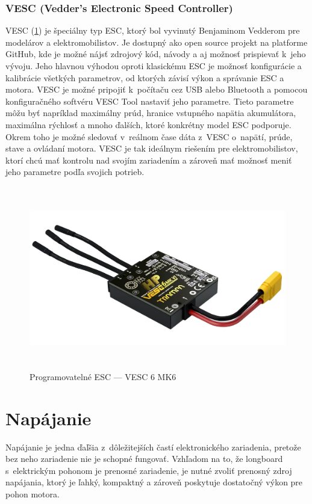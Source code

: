 \subsubsection{VESC (Vedder's Electronic Speed Controller)}
VESC (\ref{fig:vesc}) je špeciálny typ ESC, ktorý bol vyvinutý Benjaminom Vedderom pre modelárov a elektromobilistov.
Je dostupný ako open source projekt na platforme GitHub, kde je možné nájsť zdrojový kód, návody a aj možnosť prispievať k~jeho vývoju.
Jeho hlavnou výhodou oproti klasickému ESC je možnosť konfigurácie a kalibrácie všetkých parametrov, od ktorých závisí výkon a správanie ESC a motora.
VESC je možné pripojiť k~počítaču cez USB alebo Bluetooth a pomocou konfiguračného softvéru VESC Tool nastaviť jeho parametre.
Tieto parametre môžu byť napríklad maximálny prúd, hranice vstupného napätia akumulátora, maximálna rýchlosť a mnoho ďalších, ktoré konkrétny model ESC podporuje.
Okrem toho je možné sledovať v~reálnom čase dáta z~VESC o~napätí, prúde, stave a ovládaní motora.
VESC je tak ideálnym riešením pre elektromobilistov, ktorí chcú mať kontrolu nad svojím zariadením a zároveň mať možnosť meniť jeho parametre podľa svojich potrieb.\cite{VESC}

\begin{figure}[h]
    \centering
    \includegraphics[height=8cm]{figures/vesc.png}
    \caption{Programovatelné ESC --- VESC 6 MK6\cite{VESC}}\label{fig:vesc}
\end{figure}

\section{Napájanie}
Napájanie je jedna ďaľšia z~dôležitejších častí elektronického zariadenia, pretože bez neho zariadenie nie je schopné fungovať.
Vzhľadom na to, že longboard s~elektrickým pohonom je prenosné zariadenie, je nutné zvoliť prenosný zdroj napájania, ktorý je ľahký, kompaktný a zároveň poskytuje dostatočný výkon pre pohon motora.

